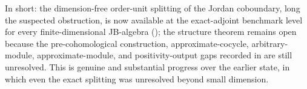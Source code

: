 In short: the dimension-free order-unit splitting of the Jordan coboundary, long
the suspected obstruction, is now available at the exact-adjoint benchmark level
for every finite-dimensional JB-algebra (); the
structure theorem  remains open because the
pre-cohomological construction, approximate-cocycle, arbitrary-module,
approximate-module, and positivity-output gaps recorded in 
are still unresolved. This is genuine and substantial progress over the earlier
state, in which even the exact splitting was unresolved beyond small dimension.
